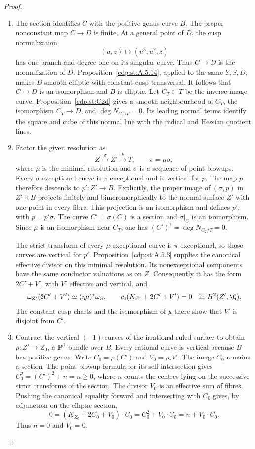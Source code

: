 \begin{proof}
\begin{enumerate}[label={$\langle1\rangle$\arabic*.},leftmargin=*]
\item The section identifies $C$ with the positive-genus curve $B$.
The proper nonconstant map $C\to D$ is finite. At a general point of
$D$, the cusp normalization
\[
 (u,z)\longmapsto(u^3,u^2,z)
\]
has one branch and degree one on its singular curve. Thus $C\to D$ is
the normalization of $D$.
Proposition~\ref{cdp:st:A.5.14}, applied to the same $Y,S,D$, makes
$D$ smooth elliptic with constant cusp transversal. It follows that
$C\to D$ is an isomorphism and $B$ is elliptic.
Let $C_T\subset T$ be the inverse-image curve.
Proposition~\ref{cdp:st:C2d} gives a smooth neighbourhood of $C_T$,
the isomorphism $C_T\to D$, and
$\deg N_{C_T/T}=0$. Its leading normal terms identify the square and
cube of this normal line with the radical and Hessian quotient lines.

\item Factor the given resolution as
\[
 Z\xrightarrow{\sigma}Z'\xrightarrow{\mu}T,
 \qquad \pi=\mu\sigma,
\]
where $\mu$ is the minimal resolution and $\sigma$ is a sequence of
point blowups. Every $\sigma$-exceptional curve is $\pi$-exceptional
and is vertical for $p$. The map $p$ therefore descends to
$p':Z'\to B$. Explicitly, the proper image of $(\sigma,p)$ in
$Z'\times B$ projects finitely and bimeromorphically to the normal
surface $Z'$ with one point in every fibre. This projection is an
isomorphism and defines $p'$, with $p=p'\sigma$.
The curve $C'=\sigma(C)$ is a section and $\sigma|_C$ is an isomorphism.
Since $\mu$ is an isomorphism near $C_T$, one has
$(C')^2=\deg N_{C_T/T}=0$.

The strict transform of every $\mu$-exceptional curve is
$\pi$-exceptional, so those curves are vertical for $p'$.
Proposition~\ref{cdp:st:A.5.3} supplies the canonical effective divisor
on this minimal resolution. Its nonexceptional components have the
same conductor valuations as on $Z$. Consequently it has the form
$2C'+V'$, with $V'$ effective and vertical, and
\[
 \omega_{Z'}(2C'+V')\simeq(\eta\mu)^*\omega_S,
 \qquad c_1(K_{Z'}+2C'+V')=0\quad\hbox{in }H^2(Z',\Q).
\]
The constant cusp charts and the isomorphism of $\mu$ there show that
$V'$ is disjoint from $C'$.

\item Contract the vertical $(-1)$-curves of the irrational ruled
surface to obtain $\rho:Z'\to Z_0$, a $\mathbf P^1$-bundle over $B$.
Every rational curve is vertical because $B$ has positive genus.
Write $C_0=\rho(C')$ and $V_0=\rho_*V'$.
The image $C_0$ remains a section. The point-blowup formula for its
self-intersection gives $C_0^2=(C')^2+n=n\ge0$, where $n$ counts the
centres lying on the successive strict transforms of the section.
The divisor $V_0$ is an effective sum of fibres.
Pushing the canonical equality forward and intersecting with $C_0$
gives, by adjunction on the elliptic section,
\[
 0=(K_{Z_0}+2C_0+V_0)\cdot C_0
   =C_0^2+V_0\cdot C_0=n+V_0\cdot C_0.
\]
Thus $n=0$ and $V_0=0$.


\end{enumerate}
\end{proof}
